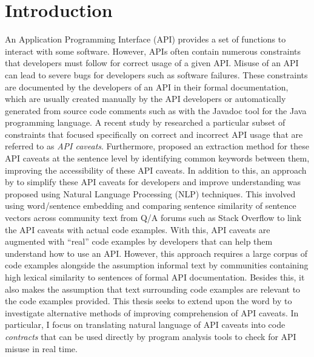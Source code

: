 \chapter{Introduction}
\label{cha:intro}
An Application Programming Interface (API) provides a set of functions to interact with some software. However, APIs often contain numerous constraints that developers must follow for correct usage of a given API. Misuse of an API can lead to severe bugs for developers such as software failures. These constraints are documented by the developers of an API in their formal documentation, which are usually created manually by the API developers or automatically generated from source code comments such as with the Javadoc tool for the Java programming language. A recent study by \citeauthor{caveat-knowledge-graph} researched a particular subset of constraints that focused specifically on correct and incorrect API usage that are referred to as \textit{API caveats}. Furthermore, \citeauthor{caveat-knowledge-graph} proposed an extraction method for these API caveats at the sentence level by identifying common keywords between them, improving the accessibility of these API caveats. 
In addition to this, an approach by \citeauthor{jiamou} to simplify these API caveats for developers and improve understanding was proposed using Natural Language Processing (NLP) techniques. This involved using word/sentence embedding and comparing sentence similarity of sentence vectors across community text from Q/A forums such as Stack Overflow to link the API caveats with actual code examples. With this, API caveats are augmented with ``real'' code examples by developers that can help them understand how to use an API. However, this approach requires a large corpus of code examples alongside the assumption informal text by communities containing high lexical similarity to sentences of formal API documentation. Besides this, it also makes the assumption that text surrounding code examples are relevant to the code examples provided.
This thesis seeks to extend upon the word by \citeauthor{caveat-knowledge-graph, jiamou, xiaoxue} to investigate alternative methods of improving comprehension of API caveats. In particular, I focus on translating natural language of API caveats into code \textit{contracts} that can be used directly by program analysis tools to check for API misuse in real time. \\

